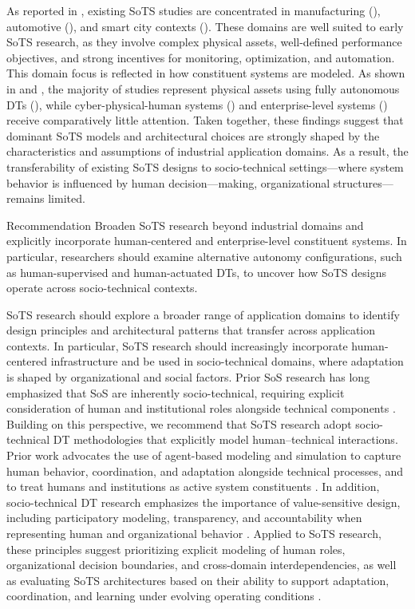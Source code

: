 As reported in , existing SoTS studies are concentrated in manufacturing (), automotive (), and smart city contexts (). These domains are well suited to early SoTS research, as they involve complex physical assets, well-defined performance objectives, and strong incentives for monitoring, optimization, and automation. This domain focus is reflected in how constituent systems are modeled. As shown in  and , the majority of studies represent physical assets using fully autonomous DTs (), while cyber-physical-human systems () and enterprise-level systems () receive comparatively little attention. Taken together, these findings suggest that dominant SoTS models and architectural choices are strongly shaped by the characteristics and assumptions of industrial application domains. As a result, the transferability of existing SoTS designs to socio-technical settings---where system behavior is influenced by human decision---making, organizational structures—remains limited.

\begin{recoframe}{Recommendation}
Broaden SoTS research beyond industrial domains and explicitly incorporate human-centered and enterprise-level constituent systems. In particular, researchers should examine alternative autonomy configurations, such as human-supervised and human-actuated DTs, to uncover how SoTS designs operate across socio-technical contexts.
\end{recoframe}

SoTS research should explore a broader range of application domains to identify design principles and architectural patterns that transfer across application contexts. In particular, SoTS research should increasingly incorporate human-centered infrastructure and be used in socio-technical domains, where adaptation is shaped by organizational and social factors. Prior SoS research has long emphasized that SoS are inherently socio-technical, requiring explicit consideration of human and institutional roles alongside technical components \cite{siemieniuch2014extending}. Building on this perspective, we recommend that SoTS research adopt socio-technical DT methodologies that explicitly model human–technical interactions. Prior work advocates the use of agent-based modeling and simulation to capture human behavior, coordination, and adaptation alongside technical processes, and to treat humans and institutions as active system constituents \cite{barn2022sociotechnical,ye2023humancentered}. In addition, socio-technical DT research emphasizes the importance of value-sensitive design, including participatory modeling, transparency, and accountability when representing human and organizational behavior \cite{barn2022sociotechnical}. Applied to SoTS research, these principles suggest prioritizing explicit modeling of human roles, organizational decision boundaries, and cross-domain interdependencies, as well as evaluating SoTS architectures based on their ability to support adaptation, coordination, and learning under evolving operating conditions \cite{ye2023humancentered}.


